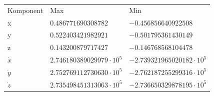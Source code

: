 \documentclass[a4paper]{article}
\begin{document}
\begin{figure}[H]
\begin{centering}
  \end{centering}
\end{figure}

\begin{table}[H]
  \centering
  \begin{tabular}{l l l}
    Komponent & Max & Min \\
    x & $0.486771690308782$ & $ -0.456856640922508$\\
    y & $0.522403421982921$ & $ -0.501795361430149$\\
    z & $0.143200879717427$ & $ -0.146768568104478$\\
    $\dot{x}$ & $2.746180389029979 \cdot 10^5$ & $-2.739321965020182 \cdot 10^5$\\
    $\dot{y}$ & $2.752769112730630 \cdot 10^5$ & $-2.762187255299316 \cdot 10^5$\\
    $\dot{z}$ & $2.735498451313063 \cdot 10^5$ & $-2.736650329878195 \cdot 10^5$\\
  \end{tabular}
\end{table}
\end{document}
